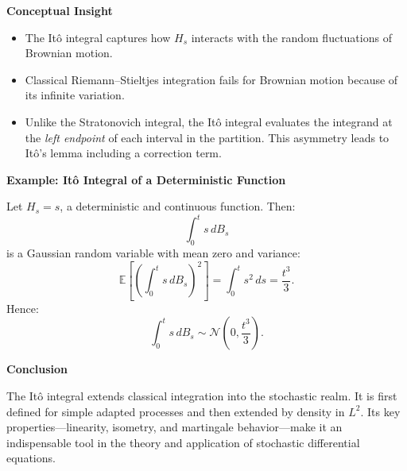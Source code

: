 \vspace{1em}
\textbf{Conceptual Insight}  
\begin{itemize}
  \item The Itô integral captures how \( H_s \) interacts with the random fluctuations of Brownian motion.
  \item Classical Riemann–Stieltjes integration fails for Brownian motion because of its infinite variation.
  \item Unlike the Stratonovich integral, the Itô integral evaluates the integrand at the \textit{left endpoint} of each interval in the partition. This asymmetry leads to Itô’s lemma including a correction term.
\end{itemize}

\vspace{1em}
\textbf{Example: Itô Integral of a Deterministic Function}  

Let \( H_s = s \), a deterministic and continuous function. Then:
\[
\int_0^t s \, dB_s
\]
is a Gaussian random variable with mean zero and variance:
\[
\mathbb{E}\left[\left( \int_0^t s \, dB_s \right)^2\right] = \int_0^t s^2 \, ds = \frac{t^3}{3}.
\]
Hence:
\[
\int_0^t s \, dB_s \sim \mathcal{N}\left(0, \frac{t^3}{3}\right).
\]

\vspace{1em}
\textbf{Conclusion}  

The Itô integral extends classical integration into the stochastic realm. It is first defined for simple adapted processes and then extended by density in \( L^2 \). Its key properties—linearity, isometry, and martingale behavior—make it an indispensable tool in the theory and application of stochastic differential equations.